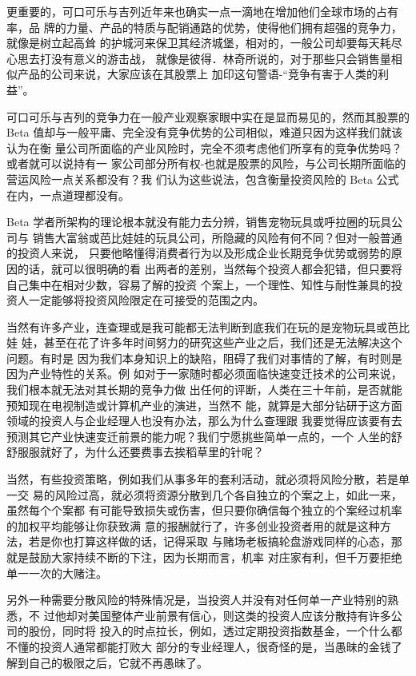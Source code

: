 \documentclass[UTF8,a4paper,zihao=-4,fontset = windows]{ctexart} %
\begin{document}
更重要的，可口可乐与吉列近年来也确实一点一滴地在增加他们全球市场的占有率，品
牌的力量、产品的特质与配销通路的优势，使得他们拥有超强的竞争力，就像是树立起高耸
的护城河来保卫其经济城堡，相对的，一般公司却要每天耗尽心思去打没有意义的游击战，
就像是彼得．林奇所说的，对于那些只会销售量相似产品的公司来说，大家应该在其股票上
加印这句警语-“竞争有害于人类的利益”。

可口可乐与吉列的竞争力在一般产业观察家眼中实在是显而易见的，然而其股票的
Beta 值却与一般平庸、完全没有竞争优势的公司相似，难道只因为这样我们就该认为在衡
量公司所面临的产业风险时，完全不须考虑他们所享有的竞争优势吗？或者就可以说持有一
家公司部分所有权-也就是股票的风险，与公司长期所面临的营运风险一点关系都没有？我
们认为这些说法，包含衡量投资风险的 Beta 公式在内，一点道理都没有。

Beta 学者所架构的理论根本就没有能力去分辨，销售宠物玩具或呼拉圈的玩具公司与
销售大富翁或芭比娃娃的玩具公司，所隐藏的风险有何不同？但对一般普通的投资人来说，
只要他略懂得消费者行为以及形成企业长期竞争优势或弱势的原因的话，就可以很明确的看
出两者的差别，当然每个投资人都会犯错，但只要将自己集中在相对少数，容易了解的投资
个案上，一个理性、知性与耐性兼具的投资人一定能够将投资风险限定在可接受的范围之内。

当然有许多产业，连查理或是我可能都无法判断到底我们在玩的是宠物玩具或芭比娃
娃，甚至在花了许多年时间努力的研究这些产业之后，我们还是无法解决这个问题。有时是
因为我们本身知识上的缺陷，阻碍了我们对事情的了解，有时则是因为产业特性的关系。例
如对于一家随时都必须面临快速变迁技术的公司来说，我们根本就无法对其长期的竞争力做
出任何的评断，人类在三十年前，是否就能预知现在电视制造或计算机产业的演进，当然不
能，就算是大部分钻研于这方面领域的投资人与企业经理人也没有办法，那么为什么查理跟
我要觉得应该要有去预测其它产业快速变迁前景的能力呢？我们宁愿挑些简单一点的，一个
人坐的舒舒服服就好了，为什么还要费事去挨稻草里的针呢？

当然，有些投资策略，例如我们从事多年的套利活动，就必须将风险分散，若是单一交
易的风险过高，就必须将资源分散到几个各自独立的个案之上，如此一来，虽然每个个案都
有可能导致损失或伤害，但只要你确信每个独立的个案经过机率的加权平均能够让你获致满
意的报酬就行了，许多创业投资者用的就是这种方法，若是你也打算这样做的话，记得采取
与赌场老板搞轮盘游戏同样的心态，那就是鼓励大家持续不断的下注，因为长期而言，机率
对庄家有利，但千万要拒绝单一一次的大赌注。

另外一种需要分散风险的特殊情况是，当投资人并没有对任何单一产业特别的熟悉，不
过他却对美国整体产业前景有信心，则这类的投资人应该分散持有许多公司的股份，同时将
投入的时点拉长，例如，透过定期投资指数基金，一个什么都不懂的投资人通常都能打败大
部分的专业经理人，很奇怪的是，当愚昧的金钱了解到自己的极限之后，它就不再愚昧了。
\end{document}
